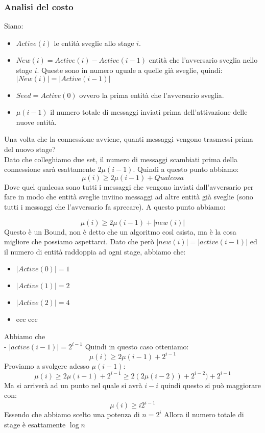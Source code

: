 \subsubsection{Analisi del costo}
Siano:
\begin{itemize}
    \item $Active(i)$ le entità sveglie allo stage $i$.
    \item $New(i) = Active(i) - Active(i-1)$  entità che l'avversario sveglia
          nello stage $i$. Queste sono in numero uguale a quelle già sveglie, quindi:
          $|New(i)|=|Active(i-1)|$
    \item $Seed = Active(0)$ ovvero la prima entità che l'avversario sveglia.
    \item $\mu(i-1)$ il numero totale di messaggi inviati prima dell'attivazione
          delle nuove entità.%
\end{itemize}
Una volta che la connessione avviene, quanti messaggi vengono trasmessi prima
del nuovo stage?\\
Dato che colleghiamo due set, il numero di messaggi scambiati prima della
connessione sarà esattamente $2\mu(i-1)$. Quindi a questo punto abbiamo:
$$\mu(i) \geq 2\mu(i-1) + Qualcosa$$ Dove quel qualcosa sono tutti i messaggi
che vengono inviati dall'avversario per fare in modo che entità sveglie inviino
messaggi ad altre entità già sveglie (sono tutti i messaggi che l'avversario fa
sprecare). A questo punto abbiamo:

$$\mu(i) \geq 2\mu(i-1) + |new(i)|$$ Questo è un Bound, non è detto che un
algoritmo così esista, ma è la cosa migliore che possiamo aspettarci. Dato che
però $|new(i)|=|active(i-1)|$ ed il numero di entità raddoppia ad ogni stage,
abbiamo che:
\begin{itemize}
    \item $|Active(0)| = 1$
    \item $|Active(1)| = 2$
    \item $|Active(2)| = 4$
    \item ecc ecc
\end{itemize}
Abbiamo che \\
- $|active(i-1)| = 2^{i-1}$ Quindi in questo caso otteniamo:
$$\mu(i) \geq 2\mu(i-1)+2^{i-1}$$ Proviamo a svolgere adesso $\mu(i-1)$:
$$\mu(i) \geq 2\mu(i-1)+2^{i-1} \geq 2(2\mu(i-2))+2^{i-2})+2^{i-1}$$ Ma si
arriverà ad un punto nel quale si avrà $i-i$ quindi questo si può maggiorare
con:
$$\mu(i) \geq i2^{i-1}$$ Essendo che abbiamo scelto una potenza di $n=2^i$
Allora il numero totale di stage è esattamente $\log n$

